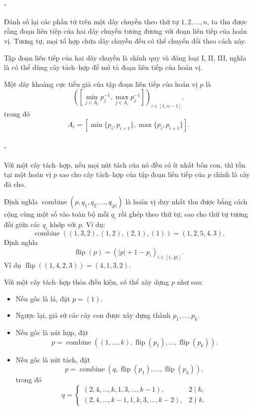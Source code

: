 \documentclass[11pt]{article}
\begin{document}
\paragraph{.}
Đánh số lại các phần tử trên một dây chuyền theo thứ tự $1,2,\ldots,n$, ta
thu được rằng đoạn liên tiếp của hai dây chuyền tương đương với đoạn liên tiếp
của hoán vị. Tương tự, mọi tổ hợp chứa dây chuyền đều có thể chuyển đổi theo
cách này.

Tập đoạn liên tiếp của hai dây chuyền là chính quy và đóng loại I, II, III,
nghĩa là có thể dùng cây tách--hợp để mô tả đoạn liên tiếp của hoán vị.

Một dãy khoảng cực tiểu giả của tập đoạn liên tiếp của hoán vị $p$ là
\[
  \left(
    \left[
      \min_{j\in A_i}p_j^{-1},
      \max_{j\in A_i}p_j^{-1}
    \right]
  \right)_{i\in[1,n-1]},
\]
trong đó
\[
  A_i=[\min\{p_i,p_{i+1}\},\max\{p_i,p_{i+1}\}].
\]

\paragraph{.}
 Với một cây tách--hợp, nếu mọi nút tách của nó đều có ít
nhất bốn con, thì tồn tại một hoán vị $p$ sao cho cây tách--hợp của tập đoạn
liên tiếp của $p$ chính là cây đã cho.

Định nghĩa
$\operatorname{combine}(p,q_1,q_2,\ldots,q_{|p|})$ là hoán vị duy nhất thu
được bằng cách cộng cùng một số vào toàn bộ mỗi $q_i$ rồi ghép theo thứ tự,
sao cho thứ tự tương đối giữa các $q_i$ khớp với $p$. Ví dụ:
\[
  \operatorname{combine}((1,3,2),(1,2),(2,1),(1))=(1,2,5,4,3).
\]
Định nghĩa
\[
  \operatorname{flip}(p)=(|p|+1-p_i)_{i\in[1,|p|]}.
\]
Ví dụ $\operatorname{flip}((1,4,2,3))=(4,1,3,2)$.

Với một cây tách--hợp thỏa điều kiện, có thể xây dựng $p$ như sau:
\begin{itemize}
  \item Nếu gốc là lá, đặt $p=(1)$.
  \item Ngược lại, giả sử các cây con được xây dựng thành
  $p_1,\ldots,p_k$.
  \item Nếu gốc là nút hợp, đặt
  \[
    p=\operatorname{combine}((1,\ldots,k),
    \operatorname{flip}(p_1),\ldots,\operatorname{flip}(p_k)).
  \]
  \item Nếu gốc là nút tách, đặt
  \[
    p=\operatorname{combine}(q,
    \operatorname{flip}(p_1),\ldots,\operatorname{flip}(p_k)),
  \]
  trong đó
  \[
    q=
    \begin{cases}
      (2,4,\ldots,k,1,3,\ldots,k-1), & 2\mid k,\\
      (2,4,\ldots,k-1,1,k,3,\ldots,k-2), & 2\nmid k.
    \end{cases}
  \]
\end{itemize}
\end{document}
